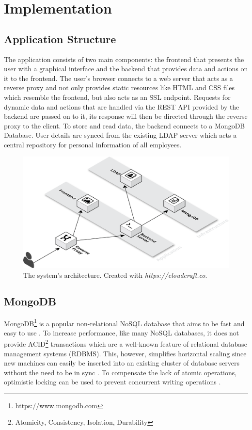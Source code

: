 \chapter{Implementation}
\section{Application Structure}
The application consists of two main components: the frontend that presents the user with a graphical interface and the backend that provides data and actions on it to the frontend.
The user's browser connects to a web server that acts as a reverse proxy and not only provides static resources like HTML and CSS files which resemble the frontend, but also acts as an SSL endpoint.
Requests for dynamic data and actions that are handled via the REST API provided by the backend are passed on to it, its response will then be directed through the reverse proxy to the client.
To store and read data, the backend connects to a MongoDB Database. User details are synced from the existing LDAP server which acts a central repository for personal information of all employees.
\begin{figure}[H]
    \centering
    \includegraphics[width=\textwidth]{images/system_architecture.png}
    \caption[Illustration: System Architecture]{The system's architecture. Created with \textit{https://cloudcraft.co}.}
    \label{fig:markovchain}
\end{figure}

\newpage

\section{MongoDB}
MongoDB\footnote{https://www.mongodb.com} is a popular non-relational NoSQL database that aims to be fast and easy to use \cite[p. 10]{MongoGuide}. To increase performance, like many NoSQL databases, it does not provide ACID\footnote{Atomicity, Consistency, Isolation, Durability} transactions which are a well-known feature of relational database management systems (RDBMS). This, however, simplifies horizontal scaling since new machines can easily be inserted into an existing cluster of database servers without the need to be in sync \cite[p. 3]{MongoGuide}. To compensate the lack of atomic operations, optimistic locking can be used to prevent concurrent writing operations \cite{MongoLock}.

